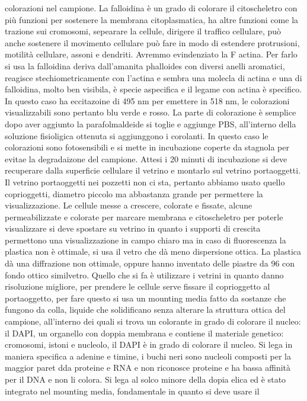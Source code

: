 colorazioni nel campione. La falloidina \`e un grado di colorare il citoscheletro con pi\`u funzioni per sostenere la membrana citoplasmatica, ha altre funzioni come la trazione
sui cromosomi, sepearare la cellule, dirigere il traffico cellulare, pu\`o anche sostenere il movimento cellulare pu\`o fare in modo di estendere protrusioni, motilit\`a cellulare, 
assoni e dendriti. Avremmo evindenziato la F actina. Per farlo si usa la falloidina deriva dall'amanita phalloides con diversi anelli aromatici, reagisce stechiometricamente con l'actina
e sembra una molecla di actina e una di falloidina, molto ben visibila, \`e specie aspecifica e il legame con actina \`e specifico. In questo caso ha eccitazoine di 495 nm per emettere
in 518 nm, le colorazioni visualizzabili sono pertanto blu verde e rosso. La parte di colorazione \`e semplice dopo aver aggiunto la parafolmaldeide si toglie e aggiunge PBS, all'interno
della soluzione fisioligica ottenuta si aggiunggono i corolanti. In questo caso le colorazioni sono fotosensibili e si mette in incubazione coperte da stagnola per evitae la degradaizone
del campione. Attesi i 20 minuti di incubazione si deve recuperare dalla superficie cellulare il vetrino e montarlo sul vetrino portaoggetti. Il vetrino portaoggetti nei pozzetti non
ci sta, pertanto abbiamo usato quello coprioggetti, diametro piccolo ma abbastanza grande per permettere la visualizzazione. Le cellule messe a crescere, colorate e fissate, alcune
permeabilizzate e colorate per marcare membrana e citoscheletro per poterle visualizzare si deve spostare su vetrino in quanto i supporti di crescita permettono una visualizzazione in 
campo chiaro ma in caso di fluorescenza la plastica non \`e ottimale, si usa il vetro che d\`a meno dispersione ottica. La plastica d\`a una diffrazione non ottimale, oppure hanno
inventato delle piastre da 96 con fondo ottico similvetro. Quello che si fa \`e utilizzare i vetrini in quanto danno risoluzione migliore, per prendere le cellule serve fissare il
coprioggetto al portaoggetto, per fare questo si usa un mounting media fatto da sostanze che fungono da colla, liquide che solidificano senza alterare la struttura ottica del campione, 
all'interno dei quali si trova un colorante in grado di colorare il nucleo: il DAPI, un organello con doppia membrana e contiene il materiale genetico: cromosomi, istoni e nucleolo, 
il DAPI \`e in grado di colorare il nucleo. Si lega in maniera specifica a adenine e timine, i buchi neri sono nucleoli composti per la maggior paret dda proteine e RNA e non riconosce
proteine e ha bassa affinit\`a per il DNA e non li colora. Si lega al solco minore della dopia elica ed \`e stato integrato nel mounting media, fondamentale in quanto si deve usare il
